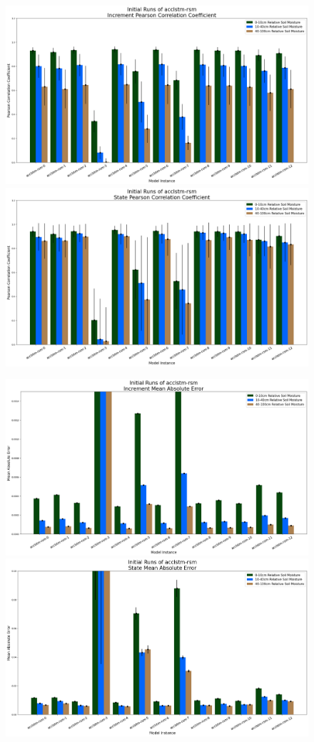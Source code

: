 \begin{figure}[hp!]
    \centering
    \includegraphics[width=.48\linewidth,draft=false]{figures/efficiency_initial-best/eval_test_efficiency_initial-acclstm-rsm_cc_res.png}
    \includegraphics[width=.48\linewidth,draft=false]{figures/efficiency_initial-best/eval_test_efficiency_initial-acclstm-rsm_cc_state.png}

    \includegraphics[width=.48\linewidth,draft=false]{figures/efficiency_initial-best/eval_test_efficiency_initial-acclstm-rsm_mae_res.png}
    \includegraphics[width=.48\linewidth,draft=false]{figures/efficiency_initial-best/eval_test_efficiency_initial-acclstm-rsm_mae_state.png}


\end{figure}
